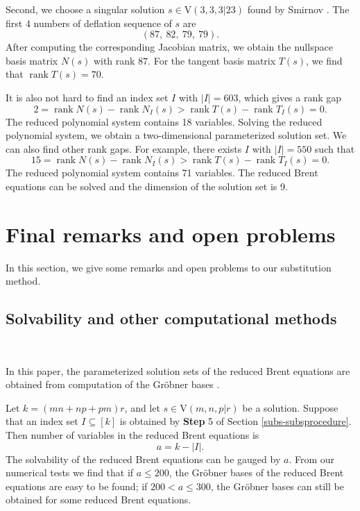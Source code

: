 \documentclass[reqno]{amsart}
\theoremstyle{definition}
\numberwithin{equation}{section}
\theoremstyle{remark}
\begin{document}
Second, we choose a singular solution $s\in\mathrm{V}(3,3,3|23)$ found by Smirnov \cite{Smir-13}. The first 4 numbers of deflation sequence of $s$ are
$$(87,~82,~79,~79).$$
After computing the corresponding Jacobian matrix, we obtain the nullspace basis matrix $N(s)$ with rank $87$. For the tangent basis matrix $T(s)$, we find that $\operatorname{rank}T(s)=70$.

It is also not hard to find an index set $I$ with $|I|=603$, which gives a rank gap
\begin{equation*} 
2=\operatorname{rank}N(s)-\operatorname{rank}N_I(s)>
\operatorname{rank}T(s)-\operatorname{rank}T_I(s)=0.
\end{equation*}
The reduced polynomial system contains 18 variables. Solving the reduced polynomial system, we obtain a two-dimensional parameterized solution set.
We can also find other rank gaps. For example, there exists $I$ with $|I|=550$ such that
\begin{equation*}
15=\operatorname{rank}N(s)-\operatorname{rank}N_I(s)>
\operatorname{rank}T(s)-\operatorname{rank}T_I(s)=0.
\end{equation*}
The reduced polynomial system contains 71 variables. The reduced Brent equations can be solved and the dimension of the solution set is 9.

\section{Final remarks and open problems}
\label{sec-remark}
In this section, we give some remarks and open problems to our substitution method.  
\subsection{Solvability and other computational methods}
\

In this paper, the parameterized solution sets of the reduced Brent equations are obtained from computation of the Gröbner bases \cite{cox25,Dec25}.  

Let $k=(mn+np+pm)r$, and let $s\in\mathrm{V}(m,n,p | r)$ be a solution. Suppose that an index set $I\subseteq [k]$ is obtained by \textbf{Step} 5 of Section \ref{subs-subsprocedure}. Then number of variables in the reduced Brent equations is $$a=k-|I|.$$
The solvability of the reduced Brent equations can be gauged by $a$. From our numerical tests we find that if $a\leq 200$, the Gröbner bases of the reduced Brent equations are easy to be found; if $200<a\leq 300$, 
the Gröbner bases can still be obtained for some reduced Brent equations.
\end{document}
